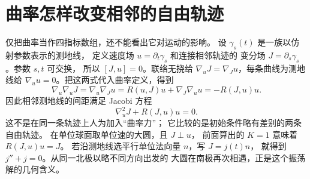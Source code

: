 \section{曲率怎样改变相邻的自由轨迹}

仅把曲率当作四指标数组，还不能看出它对运动的影响。
设 \(\gamma_s(t)\) 是一族以仿射参数表示的测地线，
定义速度场 \(u=\partial_t\gamma_s\) 和连接相邻轨迹的
变分场 \(J=\partial_s\gamma_s\)。参数 \(s,t\) 可交换，
所以 \([J,u]=0\)。联络无挠给
\(\nabla_uJ=\nabla_Ju\)，每条曲线为测地线给
\(\nabla_uu=0\)。把这两式代入曲率定义，得到
\[
\nabla_u\nabla_uJ
=\nabla_u\nabla_Ju
=R(u,J)u+\nabla_J\nabla_uu
=-R(J,u)u.
\]
因此相邻测地线的间距满足 Jacobi 方程
\begin{equation}
\nabla_u^2J+R(J,u)u=0.
\label{eq:math-jacobi-equation}
\end{equation}
这不是在同一条轨迹上人为加入“曲率力”；
它比较的是初始条件略有差别的两条自由轨迹。
在单位球面取单位速的大圆，且 \(J\perp u\)，
前面算出的 \(K=1\) 意味着 \(R(J,u)u=J\)。
若沿测地线选平行单位法向量 \(n\)，写 \(J=j(t)n\)，
就得到 \(j''+j=0\)。从同一北极以略不同方向出发的
大圆在南极再次相遇，正是这个振荡解的几何含义。
